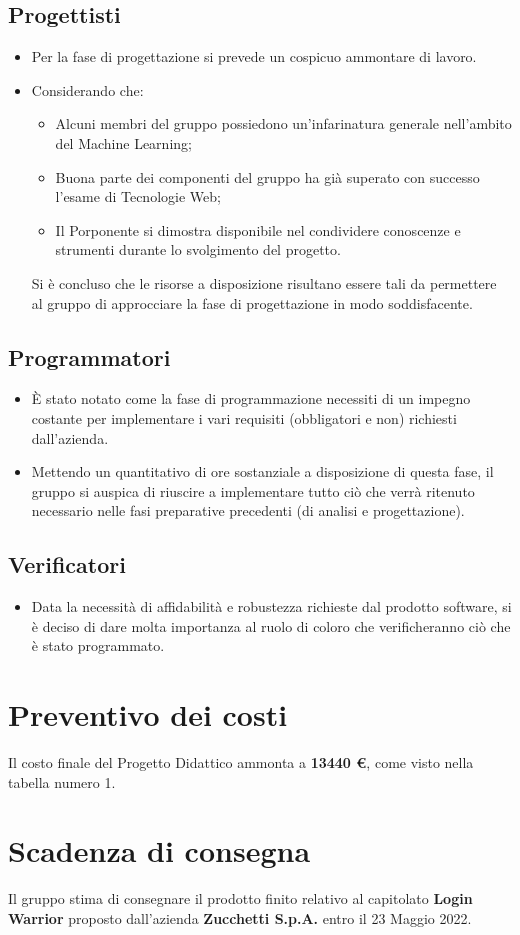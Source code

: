 \documentclass[11pt]{article}
\begin{document}
\subsection{Progettisti}
    \begin{itemize}
        \item Per la fase di progettazione si prevede un cospicuo ammontare di lavoro.
        \item Considerando che:
            \begin{itemize}
                \item Alcuni membri del gruppo possiedono un'infarinatura generale nell'ambito del Machine Learning;
                \item Buona parte dei componenti del gruppo ha già superato con successo l'esame di Tecnologie Web;
                \item Il Porponente si dimostra disponibile nel condividere conoscenze e strumenti durante lo svolgimento del progetto.
            \end{itemize}
        Si è concluso che le risorse a disposizione risultano essere tali da permettere al gruppo di approcciare la fase di progettazione in modo soddisfacente.
    \end{itemize}
\subsection{Programmatori}
    \begin{itemize}
        \item È stato notato come la fase di programmazione necessiti di un impegno costante per implementare i vari requisiti (obbligatori e non) richiesti dall'azienda.
        \item Mettendo un quantitativo di ore sostanziale a disposizione di questa fase, il gruppo si auspica di riuscire a implementare tutto ciò che verrà ritenuto necessario nelle fasi preparative precedenti (di analisi e progettazione).
    \end{itemize}
\subsection{Verificatori}
    \begin{itemize}
        \item Data la necessità di affidabilità e robustezza richieste dal prodotto software, si è deciso di dare molta importanza al ruolo di coloro che verificheranno ciò che è stato programmato.
    \end{itemize}
\section{Preventivo dei costi}
Il costo finale del Progetto Didattico ammonta a \textbf{13440 \euro}, come visto nella tabella numero 1.
\section{Scadenza di consegna}
Il gruppo stima di consegnare il prodotto finito relativo al capitolato 
\textbf{Login Warrior} proposto dall'azienda 
\textbf{Zucchetti S.p.A.} entro il 23 Maggio 2022. 
\end{document}
